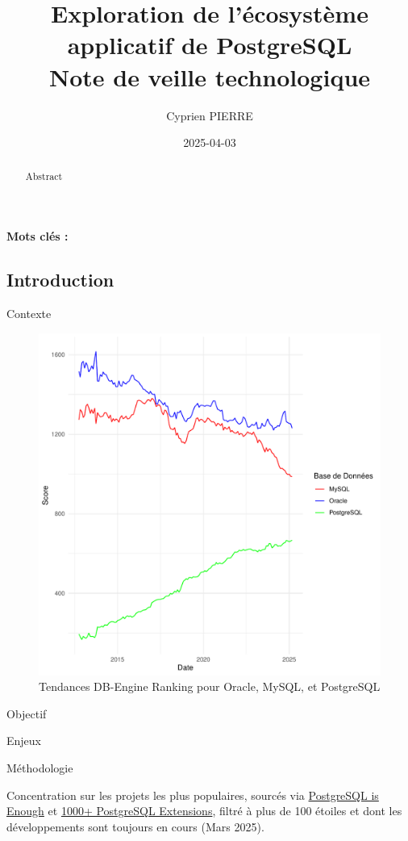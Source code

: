 \documentclass[a4paper,12pt]{article}
\author{Cyprien PIERRE \orcidlink{0009-0009-9040-6795}}
\date{2025-04-03}
\title{Exploration de l'écosystème applicatif de PostgreSQL\\\medskip
\large Note de veille technologique}
\begin{document}
\maketitle
\begin{abstract}
Abstract
\end{abstract}

\textbf{Mots clés : }

\begin{multicols*}{2}
\section*{Introduction}
\label{sec:orgee83def}
Contexte

\begin{figure}[H]
\centering
\includegraphics[width=.9\linewidth]{charts/top5.pdf}
\caption{\label{fig:org188e03e}Tendances DB-Engine Ranking pour Oracle, MySQL, et PostgreSQL}
\end{figure} 

Objectif 

Enjeux

Méthodologie

Concentration sur les projets les plus populaires, sourcés via \href{https://gist.github.com/cpursley/c8fb81fe8a7e5df038158bdfe0f06dbb}{PostgreSQL is Enough} et \href{https://gist.github.com/joelonsql/e5aa27f8cc9bd22b8999b7de8aee9d47}{1000+ PostgreSQL Extensions}, filtré à plus de 100 étoiles et dont les développements sont toujours en cours (Mars 2025).

\end{multicols*}
\end{document}
